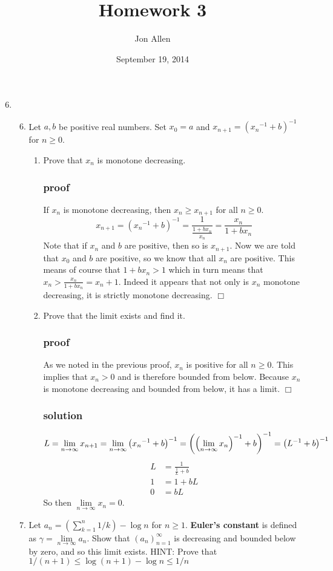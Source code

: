 \documentclass[letterpaper]{article}
\begin{document}
\title{Homework 3}
\date{September 19, 2014}
\author{Jon Allen}
\maketitle
\renewcommand{\labelenumi}{2.\arabic{enumi}}
\renewcommand{\labelenumii}{\Alph{enumii}.}
\renewcommand{\labelenumiii}{(\alph{enumiii})}
\begin{enumerate}
\setcounter{enumi}{5}
\item
  \begin{enumerate}
  \setcounter{enumii}{5}
  \item
  Let $a,b$ be positive real numbers. Set $x_0=a$ and $x_{n+1}=({x_n}^{-1}+b)^{-1}$ for $n\ge0$.
    \begin{enumerate}
    \item
    Prove that $x_n$ is monotone decreasing.
    \subsubsection*{proof}
    If $x_n$ is monotone decreasing, then $x_n\ge x_{n+1}$ for all $n\ge0$.
    \[
      x_{n+1}=({x_n}^{-1}+b)^{-1}
      =\frac{1}{\frac{1+bx_n}{x_n}}
      =\frac{x_n}{1+bx_n}
    \]
    Note that if $x_n$ and $b$ are positive, then so is $x_{n+1}$.
    Now we are told that $x_0$ and $b$ are positive, so we know that all $x_n$ are positive.
    This means of course that $1+bx_n>1$ which in turn means that $x_n>\frac{x_n}{1+bx_n}=x_  n+1$. Indeed it appears that not only is $x_n$ monotone decreasing, it is strictly monotone decreasing.
    $\Box$
    \item
    Prove that the limit exists and find it.
    \subsubsection*{proof}
    As we noted in the previous proof, $x_n$ is positive for all $n\ge0$. This implies that $x_n>0$ and is therefore bounded from below.
    Because $x_n$ is monotone decreasing and bounded from below, it has a limit.
    $\Box$
    \subsubsection*{solution}
    \[
    L=\lim_{n\to\infty}x_{n+1}=\lim_{n\to\infty}\left({x_n}^{-1}+b\right)^{-1}=\left(\left({\lim_{n\to\infty}x_n}\right)^{-1}+b\right)^{-1}=\left(L^{-1}+b\right)^{-1}\\
    \]
    \begin{align*}
      L&=\frac{1}{\frac{1}{L}+b}\\
      1&=1+bL\\
      0&=bL
    \end{align*}
    So then $\lim\limits_{n\to\infty}{x_n}=0$.
    \end{enumerate}
  \item
  Let $\displaystyle a_n=\left(\sum_{k=1}^n{1/k}\right)-\log n$ for $n\ge 1$. {\bfseries Euler's constant} is defined as $\gamma=\lim\limits_{n\to\infty}a_n$. Show that $(a_n)_{n=1}^\infty$ is decreasing and bounded below by zero, and so this limit exists. \uppercase{Hint}: Prove that $1/(n+1)\le\log(n+1)-\log n\le1/n$

\end{enumerate}
\end{enumerate}
\end{document}
